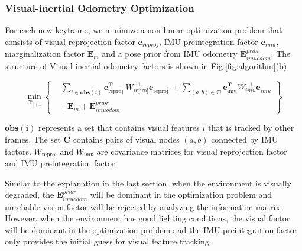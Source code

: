 \subsubsection{ \textbf{Visual-inertial Odometry Optimization}}
For each new keyframe, we minimize a non-linear optimization problem that consists of visual reprojection factor $\mathbf{e}_{reproj}$, IMU preintegration factor $\mathbf{e}_{imu}$, marginalization factor $\mathbf{E}_{m}$ and a pose prior from IMU odometry $\mathbf{E}_{imuodom}^{prior}$. The structure of Visual-inertial odometry factors is shown in Fig.\ref{fig:algorithm}(b).

\begin{equation}
	\min _{\mathbf{T}_{i+1}}\left\{
	\begin{split}
		&\sum_{ i \in \mathbf{obs}(i)}\mathbf{e}_{\text {reproj }}^{\mathbf{T}} W_{\text {reproj}}^{-1} \mathbf{e}_{\text {reproj }}^{\mathbf{}}+\sum_{(a, b) \in \mathbf{C}}\mathbf{e}_{\text {imu}}^{\mathbf{T}} W_{imu}^{-1} \mathbf{e}_{imu}^{\mathbf{}}
		\\ 
		&+\mathbf{E}_{m} + \mathbf{E}_{imuodom}^{prior}	
	\end{split}
	\right\}
\end{equation}

$\mathbf{obs(i)}$ represents a set that contains visual features $i$ that is tracked by other frames. The set $\mathbf{C}$ contains pairs of visual nodes $(a, b)$ connected by IMU factors. $W_{\text {reproj}}$ and $W_{\text {imu}} $ are covariance matrices for visual reprojection factor and IMU preintegration factor. 

Similar to the explanation in the last section, when the environment is visually degraded, the $\mathbf{E}_{imuodom}^{prior}$ will be dominant in the optimization problem and unreliable vision factor will be rejected by analyzing the information matrix. However, when the environment has good lighting conditions, the visual factor will be dominant in the optimization problem and the IMU preintegration factor only provides the initial guess for visual feature tracking.   